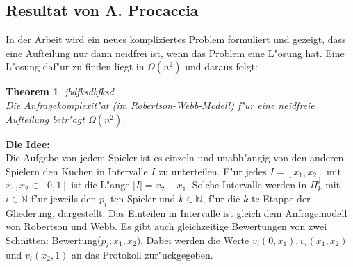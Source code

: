 \documentclass[11pt, a4paper, twoside]{article}
\newcommand{\wf}{\color{white}}
\newcommand{\tf}{\color{black}}
\newtheorem{thm}[satz]{Theorem}
\numberwithin{equation}{section}
\begin{document}
\subsection{Resultat von A. Procaccia}
In der Arbeit \cite{9} wird ein neues kompliziertes Problem formuliert und gezeigt, dass eine Aufteilung nur dann neidfrei ist, wenn das Problem eine L"osung hat. Eine L"osung daf"ur zu finden liegt in $\Omega( n^2)$ und daraus folgt:
\begin{thm} \wf jbdfksdbfksd\\ \tf
Die Anfragekomplexit"at (im Robertson-Webb-Modell) f"ur eine neidfreie Aufteilung betr"agt $\Omega(n^2)$.
\end{thm}
\textbf{Die Idee:}\\
Die Aufgabe von jedem Spieler ist es einzeln und unabh"angig von den anderen Spielern den Kuchen in Intervalle $I$ zu unterteilen. F"ur jedes $I=[x_1,x_2]$ mit $x_1,x_2 \in [0,1]$ ist die L"ange $|I|=x_2-x_1$. Solche Intervalle werden in $\Pi_k^i$ mit $i \in \mathbb{N}$ f"ur jeweils den $p_i$-ten Spieler und $k \in \mathbb{N}$, f"ur die $k$-te Etappe der Gliederung, dargestellt. Das Einteilen in Intervalle ist gleich dem Anfragemodell von Robertson und Webb. Es gibt auch gleichzeitige Bewertungen von zwei Schnitten: Bewertung($p_i;x_1,x_2$). Dabei werden die Werte $v_i(0,x_1),v_i(x_1,x_2)$ und $v_i(x_2,1)$ an das Protokoll zur"uckgegeben.
\end{document}
